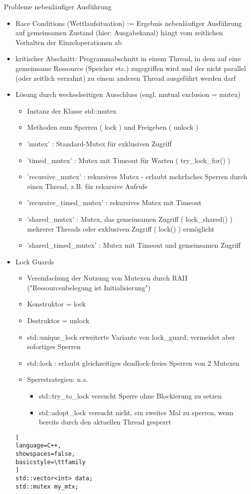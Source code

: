 \documentclass[10pt]{article}
\begin{document}
Probleme nebenläufiger Ausführung
\begin{itemize}
  \item Race Conditions (Wettlaufsituation) := Ergebnis nebenläufiger Ausführung auf gemeinsamen Zustand (hier: Ausgabekanal) hängt vom zeitlichen Verhalten der Einzeloperationen ab
  \item kritischer Abschnitt: Programmabschnitt in einem Thread, in dem auf eine gemeinsame Ressource (Speicher etc.) zugegriffen wird und der nicht parallel (oder zeitlich verzahnt) zu einem anderen Thread ausgeführt werden darf
  \item Lösung durch wechselseitigen Ausschluss (engl. mutual exclusion = mutex)
        \begin{itemize}
          \item Instanz der Klasse std::mutex
          \item Methoden zum Sperren ( lock ) und Freigeben ( unlock )
          \item 'mutex' : Standard-Mutex für exklusiven Zugriff
          \item 'timed\_mutex' : Mutex mit Timeout für Warten ( try\_lock\_for() )
          \item 'recursive\_mutex' : rekursives Mutex - erlaubt mehrfaches Sperren durch einen Thread, z.B. für rekursive Aufrufe
          \item 'recursive\_timed\_mutex' : rekursives Mutex mit Timeout
          \item 'shared\_mutex' : Mutex, das gemeinsamen Zugriff ( lock\_shared() ) mehrerer Threads oder exklusiven Zugriff ( lock() ) ermöglicht
          \item 'shared\_timed\_mutex' : Mutex mit Timeout und gemeinsamen Zugriff
        \end{itemize}
  \item Lock Guards
        \begin{itemize}
          \item Vereinfachung der Nutzung von Mutexen durch RAII ("Ressourcenbelegung ist Initialisierung")
          \item Konstruktor = lock
          \item Destruktor = unlock
          \item std::unique\_lock erweiterte Variante von lock\_guard, vermeidet aber sofortiges Sperren
          \item std::lock : erlaubt gleichzeitiges deadlock-freies Sperren von 2 Mutexen
          \item Sperrstrategien: u.a.
                \begin{itemize}
                  \item std::try\_to\_lock versucht Sperre ohne Blockierung zu setzen
                  \item std::adopt\_lock versucht nicht, ein zweites Mal zu sperren, wenn bereits durch den aktuellen Thread gesperrt
                \end{itemize}
        \end{itemize}
        \begin{lstlisting}[
language=C++,
showspaces=false,
basicstyle=\ttfamily
]
std::vector<int> data;
std::mutex my_mtx;


\end{lstlisting}
\end{itemize}
\end{document}
